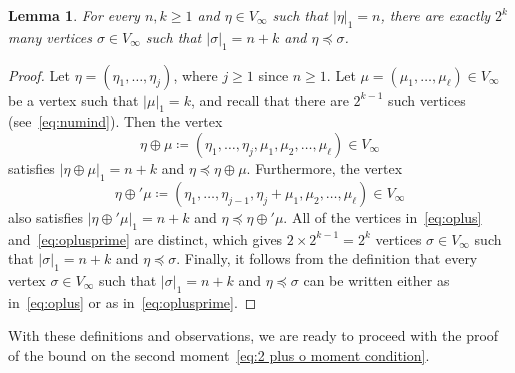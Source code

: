 \documentclass[11pt]{article}
\numberwithin{equation}{section}
\newtheorem{lemma}[theorem]{Lemma}
\theoremstyle{definition}
\begin{document}
\begin{lemma}\label{lem:partial_order_expansion}
For every $n, k \geq 1$ and $\eta \in V_{\infty}$ such that $|\eta|_{1} = n$, there are exactly $2^{k}$ many vertices $\sigma \in V_{\infty}$ such that $|\sigma|_{1} = n+k$ and $\eta \preccurlyeq \sigma$. 
\end{lemma}
\begin{proof}
Let $\eta = (\eta_{1}, \ldots, \eta_{j})$, where $j \geq 1$ since $n \geq 1$. Let $\mu = (\mu_{1}, \ldots, \mu_{\ell}) \in V_{\infty}$ be a vertex such that $|\mu|_{1} = k$, and recall that there are $2^{k-1}$ such vertices (see~\eqref{eq:numind}). Then the vertex 
\begin{equation}\label{eq:oplus}    
\eta \oplus \mu \coloneqq (\eta_1,\ldots,\eta_j,\mu_1,\mu_2,\ldots,\mu_\ell) \in V_\infty
\end{equation}
satisfies $|\eta \oplus \mu|_{1} = n + k$ and $\eta \preccurlyeq \eta \oplus \mu$. 
Furthermore, the vertex 
\begin{equation}\label{eq:oplusprime}    
\eta \oplus' \mu \coloneqq (\eta_1,\ldots,\eta_{j-1},\eta_{j}+\mu_1,\mu_2,\ldots,\mu_\ell) \in V_\infty
\end{equation}
also satisfies $|\eta \oplus' \mu|_{1} = n+k$ and $\eta \preccurlyeq \eta \oplus' \mu$. All of the vertices in~\eqref{eq:oplus} and~\eqref{eq:oplusprime} are distinct, which gives $2 \times 2^{k-1} = 2^{k}$ vertices $\sigma \in V_{\infty}$ such that $|\sigma|_{1} = n+k$ and $\eta \preccurlyeq \sigma$. 
Finally, it follows from the definition that every vertex $\sigma \in V_{\infty}$ such that $|\sigma|_{1} = n+k$ and $\eta \preccurlyeq \sigma$ can be written either as in~\eqref{eq:oplus} or as in~\eqref{eq:oplusprime}. 
\end{proof}

With these definitions and observations, we are ready to proceed with the proof of the bound on the second moment~\eqref{eq:2 plus o moment condition}.
\end{document}
